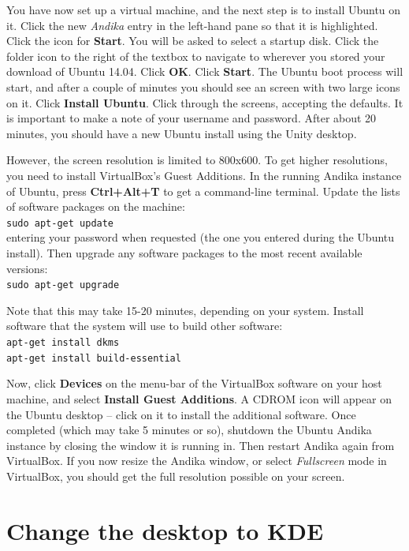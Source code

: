 You have now set up a virtual machine, and the next step is to install Ubuntu on it.  Click the new \textit{Andika} entry in the left-hand pane so that it is highlighted.  Click the icon for \textbf{Start}.  You will be asked to select a startup disk.  Click the folder icon to the right of the textbox to navigate to wherever you stored your download of Ubuntu 14.04.  Click \textbf{OK}. Click \textbf{Start}.  The Ubuntu boot process will start, and after a couple of minutes you should see an screen with two large icons on it.  Click \textbf{Install Ubuntu}.  Click through the screens, accepting the defaults.  It is important to make a note of your username and password.  After about 20 minutes, you should have a new Ubuntu install using the Unity desktop.

However, the screen resolution is limited to 800x600.  To get higher resolutions, you need to install VirtualBox's Guest Additions.
In the running Andika instance of Ubuntu, press \textbf{Ctrl+Alt+T} to get a command-line terminal.  Update the lists of software packages on the machine:\\
\verb|sudo apt-get update|\\
entering your password when requested (the one you entered during the Ubuntu install).  Then upgrade any software packages to the most recent available versions:\\
\verb|sudo apt-get upgrade|

Note that this may take 15-20 minutes, depending on your system.  Install software that the system will use to build other software:\\
\verb|apt-get install dkms|\\
\verb|apt-get install build-essential|

Now, click \textbf{Devices} on the menu-bar of the VirtualBox software on your host machine, and select \textbf{Install Guest Additions}. A CDROM icon will appear on the Ubuntu desktop -- click on it to install the additional software.  Once completed (which may take 5 minutes or so), shutdown the Ubuntu Andika instance by closing the window it is running in.  Then restart Andika again from VirtualBox.  If you now resize the Andika window, or select \textit{Fullscreen} mode in VirtualBox, you should get the full resolution possible on your screen.


\section{Change the desktop to KDE}

